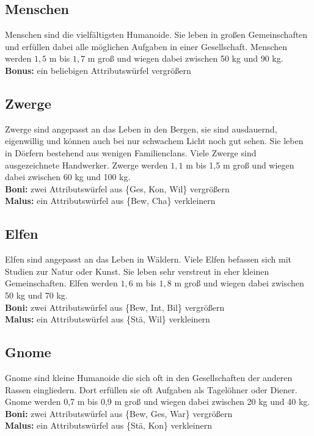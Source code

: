 \documentclass[../../Heldenanleitung2]{subfiles}
\begin{document}
\subsection{Menschen}
Menschen sind die vielfältigsten Humanoide. Sie leben in großen Gemeinschaften und erfüllen dabei alle möglichen Aufgaben in einer Gesellschaft. Menschen werden $1,5$ m bis $1,7$ m groß und wiegen dabei zwischen 50 kg und 90 kg.\\
\textbf{Bonus:} ein beliebigen Attributswürfel vergrößern

\subsection{Zwerge}
Zwerge sind angepasst an das Leben in den Bergen, sie sind ausdauernd, eigenwillig und können auch bei nur schwachem Licht noch gut sehen. Sie leben in Dörfern bestehend aus wenigen Familienclans. Viele Zwerge sind ausgezeichnete Handwerker. Zwerge werden $1,1$ m bis 1,5 m groß und wiegen dabei zwischen 60 kg und 100 kg.\\
\textbf{Boni:} zwei Attributswürfel aus \{Ges, Kon, Wil\} vergrößern\\
\textbf{Malus:} ein Attributswürfel aus \{Bew, Cha\} verkleinern

\subsection{Elfen}
Elfen sind angepasst an das Leben in Wäldern. Viele Elfen befassen sich mit Studien zur Natur oder Kunst. Sie leben sehr verstreut in eher kleinen Gemeinschaften. Elfen werden $1,6$ m bis $1,8$ m groß und wiegen dabei zwischen 50 kg und 70 kg.\\
\textbf{Boni:} zwei Attributswürfel aus \{Bew, Int, Bil\} vergrößern\\
\textbf{Malus:} ein Attributswürfel aus \{Stä, Wil\} verkleinern

\subsection{Gnome}
Gnome sind kleine Humanoide die sich oft in den Gesellschaften der anderen Rassen eingliedern. Dort erfüllen sie oft Aufgaben als Tagelöhner oder Diener. Gnome werden 0,7 m bis 0,9 m groß und wiegen dabei zwischen 20 kg und 40 kg.\\
\textbf{Boni:} zwei Attributswürfel aus \{Bew, Ges, War\} vergrößern\\
\textbf{Malus:} ein Attributswürfel aus \{Stä, Kon\} verkleinern
\end{document}

